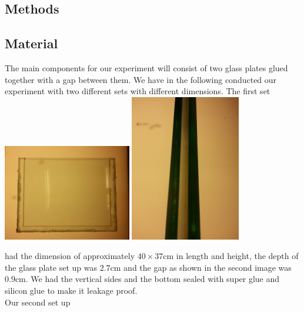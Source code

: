 \documentclass[twoside]{article}
\begin{document}
\begin{multicols}{2}
\section{Methods}
\subsection{Material}
The main components for our experiment will consist of two glass plates glued together with a gap between them. We have in the following conducted our experiment with two different sets with different dimensions. The first set\\

\includegraphics[width=0.42\textwidth]{plate1.jpg}\label{fig:plate1}
\vspace{0.2cm}
\includegraphics[width=0.36\textwidth]{plate1g.jpg}\label{fig:plate1g}

had the dimension of approximately $40\times 37$cm in length and height, the depth of the glass plate set up was $2.7$cm and the gap as shown in the second image was $0.9$cm. We had the vertical sides and the bottom sealed with super glue and silicon glue to make it leakage proof. \\ 
Our second set up \\


\end{multicols}
\end{document}
